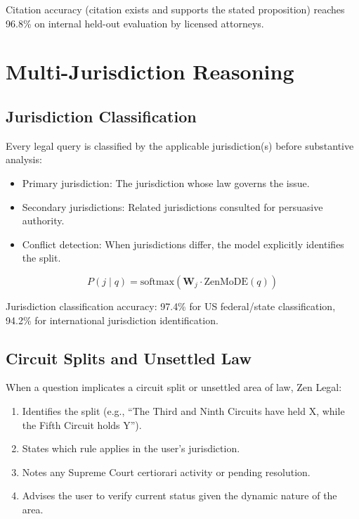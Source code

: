 \documentclass[11pt,a4paper]{article}
\begin{document}
Citation accuracy (citation exists and supports the stated proposition) reaches 96.8\% on internal held-out evaluation by licensed attorneys.

\section{Multi-Jurisdiction Reasoning}

\subsection{Jurisdiction Classification}

Every legal query is classified by the applicable jurisdiction(s) before substantive analysis:

\begin{itemize}
  \item Primary jurisdiction: The jurisdiction whose law governs the issue.
  \item Secondary jurisdictions: Related jurisdictions consulted for persuasive authority.
  \item Conflict detection: When jurisdictions differ, the model explicitly identifies the split.
\end{itemize}

\begin{equation}
P(j \mid q) = \text{softmax}(\mathbf{W}_j \cdot \text{ZenMoDE}(q))
\end{equation}

Jurisdiction classification accuracy: 97.4\% for US federal/state classification, 94.2\% for international jurisdiction identification.

\subsection{Circuit Splits and Unsettled Law}

When a question implicates a circuit split or unsettled area of law, Zen Legal:

\begin{enumerate}
  \item Identifies the split (e.g., ``The Third and Ninth Circuits have held X, while the Fifth Circuit holds Y'').
  \item States which rule applies in the user's jurisdiction.
  \item Notes any Supreme Court certiorari activity or pending resolution.
  \item Advises the user to verify current status given the dynamic nature of the area.
\end{enumerate}
\end{document}
